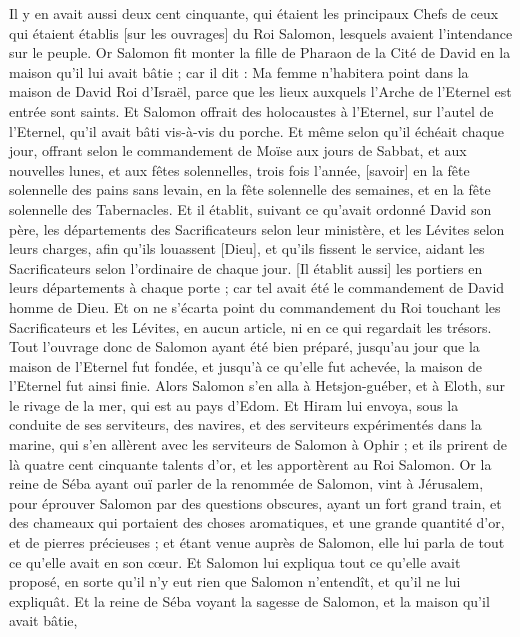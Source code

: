 \begin{multicols}{2}
Il y en avait aussi deux cent cinquante, qui étaient les principaux Chefs de ceux qui étaient établis [sur les ouvrages] du Roi Salomon, lesquels avaient l'intendance sur le peuple.
Or Salomon fit monter la fille de Pharaon de la Cité de David en la maison qu'il lui avait bâtie ; car il dit : Ma femme n'habitera point dans la maison de David Roi d'Israël, parce que les lieux auxquels l'Arche de l'Eternel est entrée sont saints.
Et Salomon offrait des holocaustes à l'Eternel, sur l'autel de l'Eternel, qu'il avait bâti vis-à-vis du porche.
Et même selon qu'il échéait chaque jour, offrant selon le commandement de Moïse aux jours de Sabbat, et aux nouvelles lunes, et aux fêtes solennelles, trois fois l'année, [savoir] en la fête solennelle des pains sans levain, en la fête solennelle des semaines, et en la fête solennelle des Tabernacles.
Et il établit, suivant ce qu'avait ordonné David son père, les départements des Sacrificateurs selon leur ministère, et les Lévites selon leurs charges, afin qu'ils louassent [Dieu], et qu'ils fissent le service, aidant les Sacrificateurs selon l'ordinaire de chaque jour. [Il établit aussi] les portiers en leurs départements à chaque porte ; car tel avait été le commandement de David homme de Dieu.
Et on ne s'écarta point du commandement du Roi touchant les Sacrificateurs et les Lévites, en aucun article, ni en ce qui regardait les trésors.
Tout l'ouvrage donc de Salomon ayant été bien préparé, jusqu'au jour que la maison de l'Eternel fut fondée, et jusqu'à ce qu'elle fut achevée, la maison de l'Eternel fut ainsi finie.
Alors Salomon s'en alla à Hetsjon-guéber, et à Eloth, sur le rivage de la mer, qui est au pays d'Edom.
Et Hiram lui envoya, sous la conduite de ses serviteurs, des navires, et des serviteurs expérimentés dans la marine, qui s'en allèrent avec les serviteurs de Salomon à Ophir ; et ils prirent de là quatre cent cinquante talents d'or, et les apportèrent au Roi Salomon.
\VerseOne{}Or la reine de Séba ayant ouï parler de la renommée de Salomon, vint à Jérusalem, pour éprouver Salomon par des questions obscures, ayant un fort grand train, et des chameaux qui portaient des choses aromatiques, et une grande quantité d'or, et de pierres précieuses ; et étant venue auprès de Salomon, elle lui parla de tout ce qu'elle avait en son cœur.
Et Salomon lui expliqua tout ce qu'elle avait proposé, en sorte qu'il n'y eut rien que Salomon n'entendît, et qu'il ne lui expliquât.
Et la reine de Séba voyant la sagesse de Salomon, et la maison qu'il avait bâtie,

\end{multicols}
